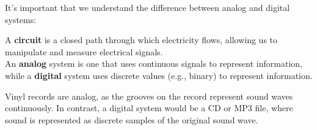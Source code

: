 \newpage 

\noindent
It's important that we understand the difference between analog and digital systems:
\begin{Def}

    \label{def:analog_digital}

    A \textbf{circuit} is a closed path through which electricity flows, allowing us to manipulate and measure electrical signals.\\
    
    \noindent
    An \textbf{analog} system is one that uses continuous signals to represent information, while a \textbf{digital} system uses discrete values (e.g., binary) to represent information.
\end{Def}

\begin{Example}

    \noindent
    Vinyl records are analog, as the grooves on the record represent sound waves continuously. 
    In contrast, a digital system would be a CD or MP3 file, where sound is represented as discrete samples of the original sound wave.
\end{Example}

